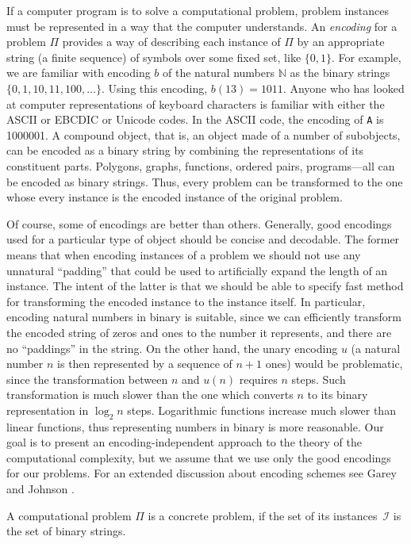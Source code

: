 If a computer program is to solve a computational problem, problem instances must be represented in a way that the computer understands.
An \emph{encoding} for a problem $\Pi$ provides a way of describing each instance of $\Pi$ by an appropriate string (a finite sequence) of symbols over some fixed set, like $\{0,1\}$.
For example, we are familiar with encoding $\mathit{b}$ of the natural numbers $\mathbb{N}$ as the binary strings $\{0,1,10,11,100,\dots\}$.
Using this encoding, $\mathit{b}(13)=1011$.
Anyone who has looked at computer representations of keyboard characters is familiar with either the ASCII or EBCDIC or Unicode codes.
In the ASCII code, the encoding of \texttt{A} is 1000001.
A compound object, that is, an object made of a number of subobjects, can be encoded as a binary string by combining the representations of its constituent parts.
Polygons, graphs, functions, ordered pairs, programs---all can be encoded as binary strings.
Thus, every problem can be transformed to the one whose every instance is the encoded instance of the original problem.

Of course, some of encodings are better than others.
Generally, good encodings used for a particular type of object should be concise and decodable.
The former means that when encoding instances of a problem we should not use any unnatural ``padding'' that could be used to artificially expand the length of an instance.
The intent of the latter is that we should be able to specify fast method for transforming the encoded instance to the instance itself.
In particular, encoding natural numbers in binary is suitable, since we can efficiently transform the encoded string of zeros and ones to the number it represents, and there are no ``paddings'' in the string.
On the other hand, the unary encoding $\mathit{u}$ (a natural number $n$ is then represented by a sequence of $n+1$ ones) would be problematic, since the transformation between $n$ and $\mathit{u}(n)$ requires $n$ steps.
Such transformation is much slower than the one which converts $n$ to its binary representation in $\log_2n$ steps.
Logarithmic functions increase much slower than linear functions, thus representing numbers in binary is more reasonable.
Our goal is to present an encoding-independent approach to the theory of the computational complexity, but we assume that we use only the good encodings for our problems.
For an extended discussion about encoding schemes see Garey and Johnson \cite[pp.~18--23]{garey}.

\begin{definition}
    A computational problem $\Pi$ is a concrete problem, if the set of its instances \,$\mathcal{I}$ is the set of binary strings.
\end{definition}

